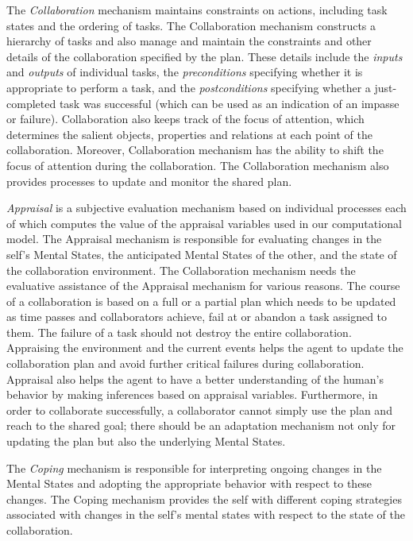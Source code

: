 \documentclass[letterpaper]{article}
\begin{document}
The \textit{Collaboration} mechanism maintains constraints on actions, including
task states and the ordering of tasks. The Collaboration mechanism constructs a
hierarchy of tasks and also manage and maintain the constraints and other
details of the collaboration specified by the plan. These details include the
\textit{inputs} and \textit{outputs} of individual tasks, the
\textit{preconditions} specifying whether it is appropriate to perform a task,
and the \textit{postconditions} specifying whether a just-completed task was
successful (which can be used as an indication of an impasse or failure).
Collaboration also keeps track of the focus of attention, which determines the
salient objects, properties and relations at each point of the collaboration.
Moreover, Collaboration mechanism has the ability to shift the focus of
attention during the collaboration. The Collaboration mechanism also provides
processes to update and monitor the shared plan.
  
\textit{Appraisal} is a subjective evaluation mechanism based on individual
processes each of which computes the value of the appraisal variables used in
our computational model. The Appraisal mechanism is responsible for evaluating
changes in the self's Mental States, the anticipated Mental States of the other,
and the state of the collaboration environment. The Collaboration mechanism
needs the evaluative assistance of the Appraisal mechanism for various reasons.
The course of a collaboration is based on a full or a partial plan which needs
to be updated as time passes and collaborators achieve, fail at or abandon a
task assigned to them. The failure of a task should not destroy the entire
collaboration. Appraising the environment and the current events helps the agent
to update the collaboration plan and avoid further critical failures during
collaboration. Appraisal also helps the agent to have a better understanding of
the human's behavior by making inferences based on appraisal variables.
Furthermore, in order to collaborate successfully, a collaborator cannot simply
use the plan and reach to the shared goal; there should be an adaptation
mechanism not only for updating the plan but also the underlying Mental States.

The \textit{Coping} mechanism is responsible for interpreting ongoing changes
in the Mental States and adopting the appropriate behavior with respect to these
changes. The Coping mechanism provides the self with different coping strategies
associated with changes in the self's mental states with respect to the state of
the collaboration.
\end{document}
